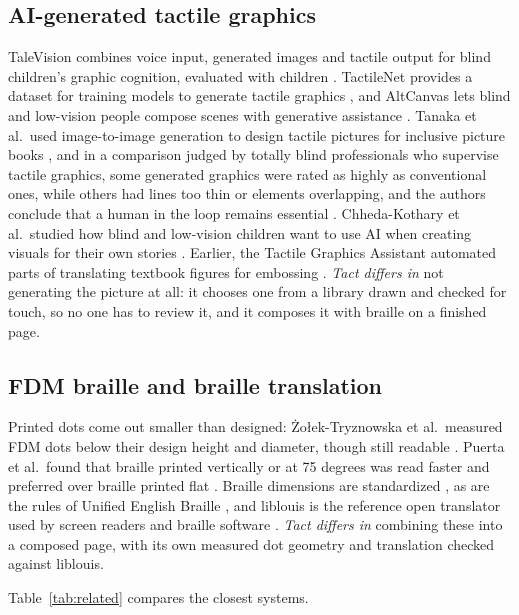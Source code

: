 \documentclass[conference]{IEEEtran}
\begin{document}
\subsection{AI-generated tactile graphics}

TaleVision combines voice input, generated images and tactile output for blind children's graphic cognition, evaluated with children \cite{talevision}. TactileNet provides a dataset for training models to generate tactile graphics \cite{tactilenet}, and AltCanvas lets blind and low-vision people compose scenes with generative assistance \cite{altcanvas}. Tanaka et al.\ used image-to-image generation to design tactile pictures for inclusive picture books \cite{tanaka2023}, and in a comparison judged by totally blind professionals who supervise tactile graphics, some generated graphics were rated as highly as conventional ones, while others had lines too thin or elements overlapping, and the authors conclude that a human in the loop remains essential \cite{tanaka2025}. Chheda-Kothary et al.\ studied how blind and low-vision children want to use AI when creating visuals for their own stories \cite{chhedakothary2026}. Earlier, the Tactile Graphics Assistant automated parts of translating textbook figures for embossing \cite{jayant2007}. \emph{Tact differs in} not generating the picture at all: it chooses one from a library drawn and checked for touch, so no one has to review it, and it composes it with braille on a finished page.

\subsection{FDM braille and braille translation}

Printed dots come out smaller than designed: Żołek-Tryznowska et al.\ measured FDM dots below their design height and diameter, though still readable \cite{zolek2024}. Puerta et al.\ found that braille printed vertically or at 75 degrees was read faster and preferred over braille printed flat \cite{puerta2024}. Braille dimensions are standardized \cite{iso17049}, as are the rules of Unified English Braille \cite{ueb}, and liblouis is the reference open translator used by screen readers and braille software \cite{liblouis}. \emph{Tact differs in} combining these into a composed page, with its own measured dot geometry and translation checked against liblouis.

Table~\ref{tab:related} compares the closest systems.
\end{document}
